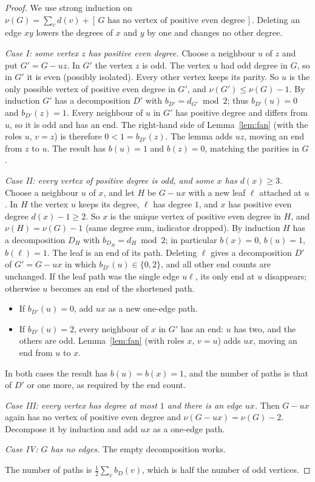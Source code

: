 \documentclass[11pt]{amsart}
\theoremstyle{remark}
\begin{document}
\begin{proof}
We use strong induction on $\nu(G)=\sum_v d(v)+[\,G\text{ has no vertex of positive even degree}\,]$. Deleting an
edge $xy$ lowers the degrees of $x$ and $y$ by one and changes no other degree.

\emph{Case I: some vertex $z$ has positive even degree.} Choose a neighbour $u$ of $z$ and put $G'=G-uz$.
In $G'$ the vertex $z$ is odd. The vertex $u$ had odd degree in $G$, so in $G'$ it is even (possibly
isolated). Every other vertex keeps its parity. So $u$ is the only possible vertex of positive even
degree in $G'$, and $\nu(G')\le\nu(G)-1$. By induction $G'$ has a decomposition $D'$ with
$b_{D'}=d_{G'}\bmod2$; thus $b_{D'}(u)=0$ and $b_{D'}(z)=1$. Every neighbour of $u$ in $G'$ has positive
degree and differs from $u$, so it is odd and has an end. The right-hand side of Lemma~\ref{lem:fan} (with
the roles $u$, $v=z$) is therefore $0<1=b_{D'}(z)$. The lemma adds $uz$, moving an end from $z$ to $u$.
The result has $b(u)=1$ and $b(z)=0$, matching the parities in $G$.

\emph{Case II: every vertex of positive degree is odd, and some $x$ has $d(x)\ge3$.} Choose a neighbour $u$
of $x$, and let $H$ be $G-ux$ with a new leaf $\ell$ attached at $u$. In $H$ the vertex $u$ keeps its
degree, $\ell$ has degree $1$, and $x$ has positive even degree $d(x)-1\ge2$. So $x$ is the unique vertex of
positive even degree in $H$, and $\nu(H)=\nu(G)-1$ (same degree sum, indicator dropped). By induction $H$
has a decomposition $D_H$ with $b_{D_H}=d_H\bmod2$; in particular $b(x)=0$, $b(u)=1$, $b(\ell)=1$. The leaf is
an end of its path. Deleting $\ell$ gives a decomposition $D'$ of $G'=G-ux$ in which $b_{D'}(u)\in\{0,2\}$,
and all other end counts are unchanged. If the leaf path was the single edge $u\ell$, its only end at $u$
disappears; otherwise $u$ becomes an end of the shortened path.
\begin{itemize}
\item If $b_{D'}(u)=0$, add $ux$ as a new one-edge path.
\item If $b_{D'}(u)=2$, every neighbour of $x$ in $G'$ has an end: $u$ has two, and the others are odd. Lemma~\ref{lem:fan}
(with roles $x$, $v=u$) adds $ux$, moving an end from $u$ to $x$.
\end{itemize}
In both cases the result has $b(u)=b(x)=1$, and the number of paths is that of $D'$ or one more, as
required by the end count.

\emph{Case III: every vertex has degree at most $1$ and there is an edge $ux$.} Then $G-ux$ again has no
vertex of positive even degree and $\nu(G-ux)=\nu(G)-2$. Decompose it by induction and add $ux$ as a
one-edge path.

\emph{Case IV: $G$ has no edges.} The empty decomposition works.

The number of paths is $\tfrac12\sum_v b_D(v)$, which is half the number of odd vertices.
\end{proof}
\end{document}
